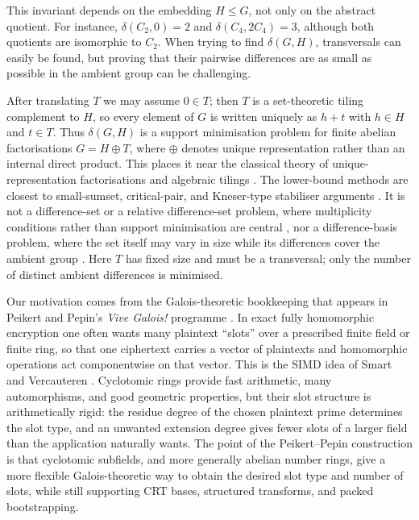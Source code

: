 \documentclass[reqno]{amsart}
\numberwithin{equation}{section}
\theoremstyle{definition}
\begin{document}
This invariant depends on the embedding \(H\leq G\), not only on the abstract
quotient.  For instance,
$\delta(C_2,0)=2$ and 
        $\delta(C_4,2C_4)=3$,
although both quotients are isomorphic to \(C_2\). When trying to find $\delta(G,H)$, transversals can easily be found, but proving that their pairwise differences are as small as possible in the ambient group can be challenging.

After translating \(T\) we may assume \(0\in T\); then \(T\) is a
set-theoretic tiling complement to \(H\), so every element of \(G\) is written
uniquely as \(h+t\) with \(h\in H\) and \(t\in T\).  Thus \(\delta(G,H)\) is a
support minimisation problem for finite abelian factorisations \(G=H\oplus T\),
where \(\oplus\) denotes unique representation rather than an internal direct
product.  This places it near the classical theory of unique-representation factorisations and algebraic tilings \cites{Hajos1942,Redei1965, Stein1974,Dinitz2006FullRankTilings, SzaboSands2009FactoringGroups}. The lower-bound methods are closest to small-sumset, critical-pair, and Kneser-type stabiliser arguments \cites{Kneser1955AbelscheGruppen, Kemperman1960, Freiman1973,TaoVu2006,Grynkiewicz2013StructuralAdditiveTheory,GreenRuzsa2007}.  It
is not a difference-set or a relative difference-set problem, where multiplicity conditions rather than support minimisation are central
\cites{Singer1938DifferenceSets,Butson1963RelativeDifferenceSets,PottSchmidtZhou2014}, nor a
difference-basis problem, where the set itself may vary in size while its
differences cover the ambient group
\cite{BanakhGavrylkiv2019DifferenceBases}.  Here \(T\) has fixed size and must
be a transversal; only the number of distinct ambient differences is minimised.

Our motivation comes from the Galois-theoretic bookkeeping that appears
in Peikert and Pepin's \emph{Vive Galois!} programme
\cite{PeikertPepinViveGalois1}.  In exact fully homomorphic encryption
one often wants many plaintext ``slots'' over a prescribed finite field
or finite ring, so that one ciphertext carries a vector of plaintexts
and homomorphic operations act componentwise on that vector.  This is the
SIMD idea of Smart and Vercauteren \cite{SmartVercauteren2014SIMD}.
Cyclotomic rings provide fast arithmetic, many automorphisms, and good
geometric properties, but their slot structure is arithmetically rigid:
the residue degree of the chosen plaintext prime determines the slot
type, and an unwanted extension degree gives fewer slots of a larger
field than the application naturally wants.  The point of the
Peikert--Pepin construction is that cyclotomic subfields, and more
generally abelian number rings, give a more flexible Galois-theoretic
way to obtain the desired slot type and number of slots, while still
supporting CRT bases, structured transforms, and packed bootstrapping.
\end{document}
